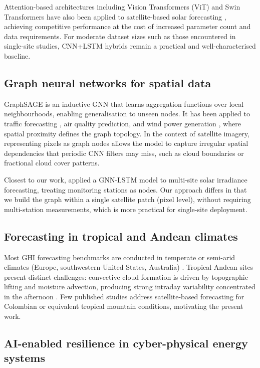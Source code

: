 Attention-based architectures including Vision Transformers (ViT) and Swin
Transformers have also been applied to satellite-based solar forecasting
\cite{acikgoz2022,liu2023}, achieving competitive performance at the cost of
increased parameter count and data requirements. For moderate dataset sizes such
as those encountered in single-site studies, CNN+LSTM hybrids remain a practical
and well-characterised baseline.

\subsection{Graph neural networks for spatial data}

GraphSAGE \cite{hamilton2017} is an inductive GNN that learns aggregation
functions over local neighbourhoods, enabling generalisation to unseen nodes.
It has been applied to traffic forecasting \cite{li2018}, air quality prediction,
and wind power generation \cite{kazem2021}, where spatial proximity defines the
graph topology. In the context of satellite imagery, representing pixels as graph
nodes allows the model to capture irregular spatial dependencies that periodic
CNN filters may miss, such as cloud boundaries or fractional cloud cover patterns.

Closest to our work, \cite{ji2022} applied a GNN-LSTM model to multi-site solar
irradiance forecasting, treating monitoring stations as nodes. Our approach differs
in that we build the graph within a single satellite patch (pixel level), without
requiring multi-station measurements, which is more practical for single-site
deployment.

\subsection{Forecasting in tropical and Andean climates}

Most GHI forecasting benchmarks are conducted in temperate or semi-arid climates
(Europe, southwestern United States, Australia) \cite{paletta2022,benchmarks2023}.
Tropical Andean sites present distinct challenges: convective cloud formation is
driven by topographic lifting and moisture advection, producing strong intraday
variability concentrated in the afternoon \cite{poveda2004}. Few published studies
address satellite-based forecasting for Colombian or equivalent tropical mountain
conditions, motivating the present work.

\subsection{AI-enabled resilience in cyber-physical energy systems}

